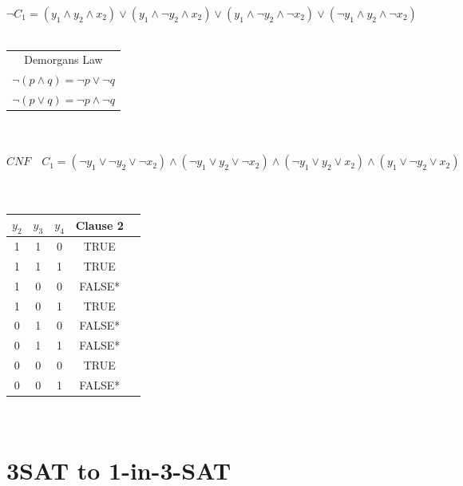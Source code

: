\documentclass[a4paper]{report}
\begin{document}
$\neg C_1 = (y_1 \wedge y_2 \wedge x_2) \vee (y_1 \wedge \neg y_2 \wedge x_2) \vee (y_1 \wedge \neg y_2 \wedge \neg x_2) \vee (\neg y_1 \wedge y_2 \wedge \neg x_2)$\\
\\
\begin{tabular}{|c|}
\hline
Demorgans Law\\
$\neg( p \wedge q ) = \neg p \vee \neg q$\\
$\neg( p \vee q ) = \neg p \wedge \neg q$\\
\hline
\end{tabular}\\
\\
$CNF\quad C_1 = (\neg y_1 \vee \neg y_2 \vee \neg x_2) \wedge ( \neg y_1 \vee y_2 \vee \neg x_2) \wedge (\neg y_1 \vee y_2 \vee x_2) \wedge ( y_1 \vee \neg y_2 \vee x_2) $\\
\\
\\
\begin{tabular}{ |c|c|c|c|c| }
\hline
	
$y_2$&$y_3$&$y_4$&Clause 2\\
\hline		
1&1&0&	TRUE\\
1&1&1&	TRUE\\
1&0&0&	FALSE*\\
1&0&1&	TRUE\\
0&1&0&	FALSE*\\
0&1&1&	FALSE*\\
0&0&0&	TRUE\\
0&0&1&	FALSE*\\
\hline
\end{tabular}\\



\section{3SAT to 1-in-3-SAT}
\label{sec:3satto13}





\end{document}

